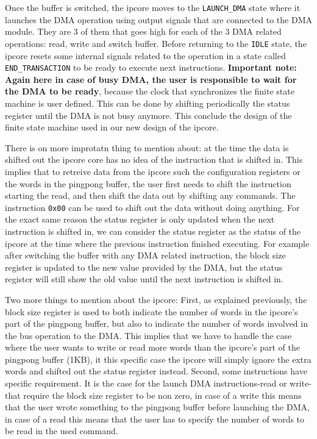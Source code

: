 \documentclass[a4paper,11pt,oneside]{report}
\begin{document}
Once the buffer is switched, the ipcore moves to the \texttt{LAUNCH_DMA} state where it launches the DMA operation using output signals that are connected to the DMA module. 
They are 3 of them that goes high for each of the 3 DMA related operations: read, write and switch buffer.
Before returning to the \texttt{IDLE} state, the ipcore resets some internal signals related to the operation in a state called \texttt{END_TRANSACTION} to be ready to execute next instructions.
\textbf{Important note: Again here in case of busy DMA, the user is responsible to wait for the DMA to be ready}, because the clock that synchronizes the finite state machine is user defined.
This can be done by shifting periodically the status register until the DMA is not busy anymore.
This conclude the design of the finite state machine used in our new design of the ipcore.

There is on more improtatn thing to mention about: at the time the data is shifted out the ipcore core has no idea of the instruction that is shifted in. This implies
that to retreive data from the ipcore such the configuration registers or the words in the pingpong buffer, the user first needs to shift the instruction starting the read,
and then shift the data out by shifting any commands. The instruction \texttt{0x00} can be used to shift out the data without doing anything. 
For the exact same reason the status register is only updated when the next instruction is shifted in, we can consider the status register as the status of the ipcore at the time where
the previous instruction finished executing. For example after switching the buffer with any DMA related instruction, the block size register is 
updated to the new value provided by the DMA, but the status register will still show the old value until the next instruction is shifted in.

Two more things to mention about the ipcore:
First, as explained previously, the block size register is used to both indicate the number of words in the ipcore's part of the pingpong buffer, but also to indicate the number of words involved in the bus operation to the DMA.
This implies that we have to handle the case where the user wants to write or read more words than the ipcore's part of the pingpong buffer (1KB), 
it this specific case the ipcore will simply ignore the extra words and shifted out the status register instead. 
Second, some instructions have specific requirement. It is the case for the launch DMA instructions-read or write- that require the 
block size register to be non zero, in case of a write this means that the user wrote something to the pingpong buffer before launching the DMA, in case of a read this means
that the user has to specify the number of words to be read in the used command. 
\end{document}
